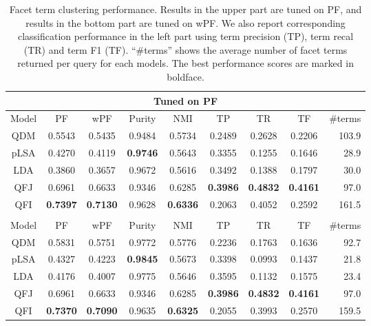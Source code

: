 \begin{table}[ht!]
\centering
\caption{Facet term clustering performance. Results in the upper part are tuned on PF, and results in the bottom part are tuned on wPF. We also report corresponding classification performance in the left part using term precision (TP), term recal (TR) and term F1 (TF). ``\#terms'' shows the average number of facet terms returned per query for each models. The best performance scores are marked in boldface.}
\label{tab:intrinsic-pair}
\begin{tabular}{|c|c|c|c|c||c|c|c|r|} \hline
\multicolumn{9}{|c|}{Tuned on PF} \\\hline
Model & PF & wPF & Purity & NMI & TP & TR & TF & \#terms \\ \hline
QDM & 0.5543 & 0.5435 & 0.9484 & 0.5734 & 0.2489 & 0.2628 & 0.2206 & 103.9 \\ \hline
pLSA & 0.4270 & 0.4119 & \textbf{0.9746} & 0.5643 & 0.3355 & 0.1255 & 0.1646 & 28.9 \\ \hline
LDA & 0.3860 & 0.3657 & 0.9672 & 0.5616 & 0.3492 & 0.1388 & 0.1797 & 30.0 \\ \hline
QFJ & 0.6961 & 0.6633 & 0.9346 & 0.6285 & \textbf{0.3986} & \textbf{0.4832} & \textbf{0.4161} & 97.0 \\ \hline
QFI & \textbf{0.7397} & \textbf{0.7130} & 0.9628 & \textbf{0.6336} & 0.2063 & 0.4052 & 0.2592 & 161.5 \\ 
\hhline{|=========|}
\multicolumn{9}{|c|}{Tuned on wPF} \\\hline
Model & PF & wPF & Purity & NMI & TP & TR & TF & \#terms \\ \hline
QDM & 0.5831 & 0.5751 & 0.9772 & 0.5776 & 0.2236 & 0.1763 & 0.1636 & 92.7 \\ \hline
pLSA & 0.4327 & 0.4223 & \textbf{0.9845} & 0.5673 & 0.3398 & 0.0993 & 0.1437 & 21.8 \\ \hline
LDA & 0.4176 & 0.4007 & 0.9775 & 0.5646 & 0.3595 & 0.1132 & 0.1575 & 23.4 \\ \hline
QFJ & 0.6961 & 0.6633 & 0.9346 & 0.6285 & \textbf{0.3986} & \textbf{0.4832} & \textbf{0.4161} & 97.0 \\ \hline
QFI & \textbf{0.7370} & \textbf{0.7090} & 0.9635 & \textbf{0.6325} & 0.2055 & 0.3993 & 0.2570 & 159.5 \\ \hline
\end{tabular}
\end{table}


